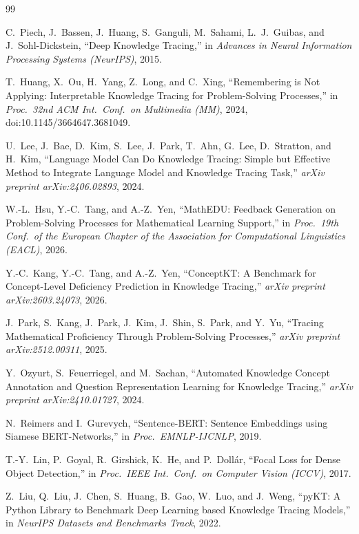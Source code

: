 \documentclass[11pt]{article}
\begin{document}
\begin{thebibliography}{99}
\setlength{\itemsep}{2pt}

C.~Piech, J.~Bassen, J.~Huang, S.~Ganguli, M.~Sahami, L.~J.~Guibas, and
J.~Sohl-Dickstein, ``Deep Knowledge Tracing,'' in \emph{Advances in Neural
Information Processing Systems (NeurIPS)}, 2015.

T.~Huang, X.~Ou, H.~Yang, Z.~Long, and C.~Xing, ``Remembering is Not Applying:
Interpretable Knowledge Tracing for Problem-Solving Processes,'' in \emph{Proc.\ 32nd
ACM Int.\ Conf.\ on Multimedia (MM)}, 2024, doi:10.1145/3664647.3681049.

U.~Lee, J.~Bae, D.~Kim, S.~Lee, J.~Park, T.~Ahn, G.~Lee, D.~Stratton, and H.~Kim,
``Language Model Can Do Knowledge Tracing: Simple but Effective Method to Integrate
Language Model and Knowledge Tracing Task,'' \emph{arXiv preprint arXiv:2406.02893},
2024.

W.-L.~Hsu, Y.-C.~Tang, and A.-Z.~Yen, ``MathEDU: Feedback Generation on
Problem-Solving Processes for Mathematical Learning Support,'' in \emph{Proc.\ 19th
Conf.\ of the European Chapter of the Association for Computational Linguistics
(EACL)}, 2026.

Y.-C.~Kang, Y.-C.~Tang, and A.-Z.~Yen, ``ConceptKT: A Benchmark for Concept-Level
Deficiency Prediction in Knowledge Tracing,'' \emph{arXiv preprint arXiv:2603.24073},
2026.

J.~Park, S.~Kang, J.~Park, J.~Kim, J.~Shin, S.~Park, and Y.~Yu, ``Tracing
Mathematical Proficiency Through Problem-Solving Processes,'' \emph{arXiv preprint
arXiv:2512.00311}, 2025.

Y.~Ozyurt, S.~Feuerriegel, and M.~Sachan, ``Automated Knowledge Concept Annotation
and Question Representation Learning for Knowledge Tracing,'' \emph{arXiv preprint
arXiv:2410.01727}, 2024.

N.~Reimers and I.~Gurevych, ``Sentence-BERT: Sentence Embeddings using Siamese
BERT-Networks,'' in \emph{Proc.\ EMNLP-IJCNLP}, 2019.

T.-Y.~Lin, P.~Goyal, R.~Girshick, K.~He, and P.~Doll\'ar, ``Focal Loss for Dense
Object Detection,'' in \emph{Proc.\ IEEE Int.\ Conf.\ on Computer Vision (ICCV)},
2017.

Z.~Liu, Q.~Liu, J.~Chen, S.~Huang, B.~Gao, W.~Luo, and J.~Weng, ``pyKT: A Python
Library to Benchmark Deep Learning based Knowledge Tracing Models,'' in \emph{NeurIPS
Datasets and Benchmarks Track}, 2022.

\end{thebibliography}
\end{document}
